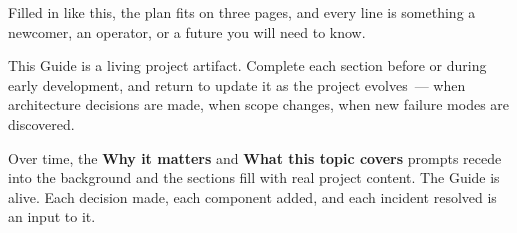 \noindent{}Filled in like this, the plan fits on three pages, and every line is something a newcomer, an operator, or a future you will need to know.

\label{project-planning-guide:how-this-guide-evolves}

This Guide is a living project artifact. Complete each section before or during early development, and return to update it as the project evolves~--- when architecture decisions are made, when scope changes, when new failure modes are discovered.

Over time, the \textbf{Why it matters} and \textbf{What this topic covers} prompts recede into the background and the sections fill with real project content. The Guide is alive. Each decision made, each component added, and each incident resolved is an input to it.

